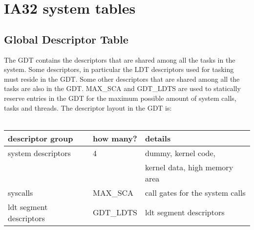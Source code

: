 \documentclass[11pt, letterpaper, twoside, english]{book}
\begin{document}
\section{IA32 system tables}

\subsection{Global Descriptor Table}  \label{subsec:GDT}

The GDT contains the descriptors that are shared among all the tasks in the system. Some descriptors, in particular the LDT descriptors used for tasking must reside in the GDT. Some other descriptors that are shared among all the tasks are also in the GDT. \textsf{MAX\_SCA} and \textsf{GDT\_LDTS} are used to statically reserve entries in the GDT for the maximum possible amount of system calls, tasks and threads. The descriptor layout in the GDT is: \\
\\
\begin{tabular}{|l|l|l|}
\hline
\textbf{descriptor group} & \textbf{how many?} & \textbf{details} \\
\hline
system descriptors & 4 & dummy, kernel code, \\
 & & kernel data, high memory area \\
\hline
syscalls & \textsf{MAX\_SCA} & call gates for the system calls \\
\hline
 ldt segment descriptors & \textsf{GDT\_LDTS} & ldt segment descriptors \\
\hline 
\end{tabular}\\
 \\
\end{document}
